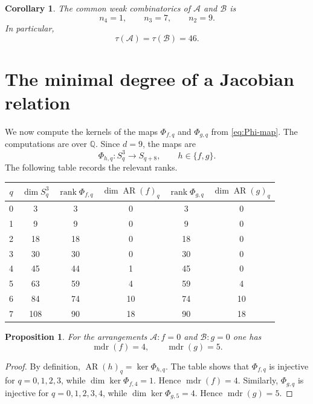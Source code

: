 \documentclass[11pt]{amsart}
\newcommand{\QQ}{\mathbb Q}
\newcommand{\cA}{\mathcal A}
\newcommand{\cB}{\mathcal B}
\newcommand{\AR}{\operatorname{AR}}
\newcommand{\mdr}{\operatorname{mdr}}
\newcommand{\rank}{\operatorname{rank}}
\theoremstyle{plain}
\newtheorem{proposition}[theorem]{Proposition}
\newtheorem{corollary}[theorem]{Corollary}
\theoremstyle{definition}
\numberwithin{equation}{section}
\begin{document}
\begin{corollary}\label{cor:weak-combinatorics}
The common weak combinatorics of \(\cA\) and \(\cB\) is
\[
n_4=1,
\qquad
n_3=7,
\qquad
n_2=9.
\]
In particular,
\[
\tau(\cA)=\tau(\cB)=46.
\]
\end{corollary}


\section{The minimal degree of a Jacobian relation}

We now compute the kernels of the maps \(\Phi_{f,q}\) and \(\Phi_{g,q}\) from \eqref{eq:Phi-map}.  The computations are over \(\QQ\).  Since \(d=9\), the maps are
\[
\Phi_{h,q}:S_q^3\longrightarrow S_{q+8},
\qquad h\in\{f,g\}.
\]
The following table records the relevant ranks.

\begin{center}
\begin{tabular}{c|c|c|c|c|c}
\toprule
\(q\) & \(\dim S_q^3\) & \(\rank \Phi_{f,q}\) & \(\dim\AR(f)_q\) & \(\rank \Phi_{g,q}\) & \(\dim\AR(g)_q\) \\
\midrule
0 & 3  & 3  & 0 & 3  & 0 \\
1 & 9  & 9  & 0 & 9  & 0 \\
2 & 18 & 18 & 0 & 18 & 0 \\
3 & 30 & 30 & 0 & 30 & 0 \\
4 & 45 & 44 & 1 & 45 & 0 \\
5 & 63 & 59 & 4 & 59 & 4 \\
6 & 84 & 74 & 10 & 74 & 10 \\
7 & 108& 90 & 18 & 90 & 18 \\
\bottomrule
\end{tabular}
\end{center}

\begin{proposition}\label{prop:mdr}
For the arrangements \(\cA:f=0\) and \(\cB:g=0\) one has
\[
\mdr(f)=4,
\qquad
\mdr(g)=5.
\]
\end{proposition}

\begin{proof}
By definition, \(\AR(h)_q=\ker\Phi_{h,q}\).  The table shows that \(\Phi_{f,q}\) is injective for \(q=0,1,2,3\), while \(\dim\ker\Phi_{f,4}=1\).  Hence \(\mdr(f)=4\).  Similarly, \(\Phi_{g,q}\) is injective for \(q=0,1,2,3,4\), while \(\dim\ker\Phi_{g,5}=4\).  Hence \(\mdr(g)=5\).
\end{proof}
\end{document}
